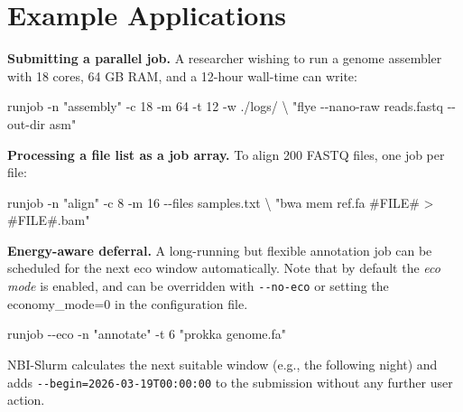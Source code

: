 \documentclass[
]{article}
\newenvironment{Shaded}{}{}
\newcommand{\AttributeTok}[1]{\textcolor[rgb]{0.49,0.56,0.16}{#1}}
\newcommand{\DataTypeTok}[1]{\textcolor[rgb]{0.56,0.13,0.00}{#1}}
\newcommand{\ExtensionTok}[1]{#1}
\newcommand{\NormalTok}[1]{#1}
\newcommand{\StringTok}[1]{\textcolor[rgb]{0.25,0.44,0.63}{#1}}
\begin{document}
\section{Example Applications}\label{example-applications}

\textbf{Submitting a parallel job.} A researcher wishing to run a genome
assembler with 18 cores, 64 GB RAM, and a 12-hour wall-time can write:

\begin{Shaded}
\begin{Highlighting}[]
\ExtensionTok{runjob} \AttributeTok{{-}n} \StringTok{"assembly"} \AttributeTok{{-}c}\NormalTok{ 18 }\AttributeTok{{-}m}\NormalTok{ 64 }\AttributeTok{{-}t}\NormalTok{ 12 }\AttributeTok{{-}w}\NormalTok{ ./logs/ }\DataTypeTok{\textbackslash{}}
  \StringTok{"flye {-}{-}nano{-}raw reads.fastq {-}{-}out{-}dir asm"}
\end{Highlighting}
\end{Shaded}

\textbf{Processing a file list as a job array.} To align 200 FASTQ
files, one job per file:

\begin{Shaded}
\begin{Highlighting}[]
\ExtensionTok{runjob} \AttributeTok{{-}n} \StringTok{"align"} \AttributeTok{{-}c}\NormalTok{ 8 }\AttributeTok{{-}m}\NormalTok{ 16 }\AttributeTok{{-}{-}files}\NormalTok{ samples.txt }\DataTypeTok{\textbackslash{}}
  \StringTok{"bwa mem ref.fa \#FILE\# \textgreater{} \#FILE\#.bam"}
\end{Highlighting}
\end{Shaded}

\textbf{Energy-aware deferral.} A long-running but flexible annotation
job can be scheduled for the next eco window automatically. Note that by
default the \emph{eco mode} is enabled, and can be overridden with
\texttt{-\/-no-eco} or setting the economy\_mode=0 in the configuration
file.

\begin{Shaded}
\begin{Highlighting}[]
\ExtensionTok{runjob} \AttributeTok{{-}{-}eco} \AttributeTok{{-}n} \StringTok{"annotate"} \AttributeTok{{-}t}\NormalTok{ 6 }\StringTok{"prokka genome.fa"}
\end{Highlighting}
\end{Shaded}

NBI-Slurm calculates the next suitable window (e.g., the following
night) and adds \texttt{-\/-begin=2026-03-19T00:00:00} to the submission
without any further user action.
\end{document}
